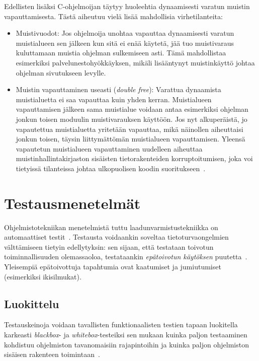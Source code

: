 Edellisten lisäksi C-ohjelmoijan täytyy huoleehtia dynaamisesti varatun muistin vapauttamisesta.
Tästä aiheutuu vielä lisää mahdollisia virhetilanteita:

\begin{itemize}
    \item Muistivuodot: Jos ohjelmoija unohtaa vapauttaa dynaamisesti varatun muistialueen
          sen jälkeen kun sitä ei enää käytetä,
          jää tuo muistivaraus kuluttamaan muistia ohjelman sulkemiseen asti.
          Tämä mahdollistaa esimerkiksi palvelunestohyökkäyksen,
          mikäli lisääntynyt muistinkäyttö johtaa ohjelman sivutukseen levylle.
      \item Muistin vapauttaminen useasti (\emph{double free}):
          Varattua dynaamista muistialuetta ei saa vapauttaa kuin yhden kerran.
          Muistialueen vapauttamisen jälkeen sama muistialue voidaan antaa esimerkiksi
          ohjelman jonkun toisen moduulin muistivarauksen käyttöön.
          Jos nyt alkuperäistä, jo vapautettua muistialuetta yritetään vapauttaa,
          mikä näinollen aiheuttaisi jonkun toisen, täysin liittymättömän muistialueen vapauttamisen.
          Yleensä vapautetun muistialueen vapauttaminen uudelleen aiheuttaa muistinhallintakirjaston
          sisäisten tietorakenteiden korruptoitumisen,
          joka voi tietyissä tilanteissa johtaa ulkopuolisen koodin suoritukseen~\cite{DoubleFree}.

\end{itemize}

\section{Testausmenetelmät}

Ohjelmistotekniikan menetelmistä tuttu laadunvarmistustekniikka on automaattiset testit~\cite{Sommerville}.
Testausta voidaankin soveltaa tietoturvaongelmien välttämiseen tietyin edellytyksin:
sen sijaan, että testataan toivotun toiminnallisuuden olemassaoloa,
testataankin \emph{epätoivotun käytöksen} puutetta~\cite{OuluBrowser}.
Yleisempiä epätoivottuja tapahtumia ovat kaatumiset ja jumiutumiset (esimerkiksi ikisilmukat).

\subsection{Luokittelu}

Testauskeinoja voidaan tavallisten funktionaalisten testien tapaan luokitella karkeasti \emph{blackbox}- ja \emph{whitebox}-testeiksi sen mukaan kuinka paljon
testaaminen kohdistuu ohjelmiston tavanomaisiin rajapintoihin ja kuinka paljon ohjelmiston sisäisen rakenteen toimintaan~\cite{Sommerville}.

